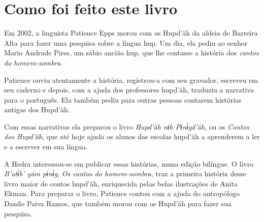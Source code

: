 \chapter{Como foi feito este livro}

Em 2002, a linguista Patience Epps morou com os Hupd’äh da aldeia de Barreira Alta para fazer uma pesquisa sobre a língua hup. Um dia, ela pediu ao senhor Mario Andrade Pires, um sábio ancião hup, que lhe contasse a história dos \textit{cantos do homem-sombra}.

Patience ouviu atentamente a história, registrou-a com seu gravador, escreveu em seu caderno e depois, com a ajuda dos professores hupd’äh, traduziu a narrativa para o português. Ela também pediu para outras pessoas contarem histórias antigas dos Hupd’äh.

Com essas narrativas ela preparou o livro \textit{Hupd’äh nɨh Pɨnɨ̀gd’äh}, ou os \textit{Contos dos Hupd’äh}, que até hoje ajuda os alunos das escolas hupd’äh a aprenderem a ler e a escrever em sua língua.

A Hedra interessou-se em publicar essas histórias, numa edição bilíngue. O livro \textit{B’atɨ́b’ yám pɨnɨ̀g}, \textit{Os cantos do homem-sombra}, traz a primeira história desse livro maior de contos hupd’äh, enriquecida pelas belas ilustrações de Anita Ekman. Para preparar o livro, Patience contou com a ajuda do antropólogo Danilo Paiva Ramos, que também morou com os Hupd’äh para fazer sua pesquisa.



